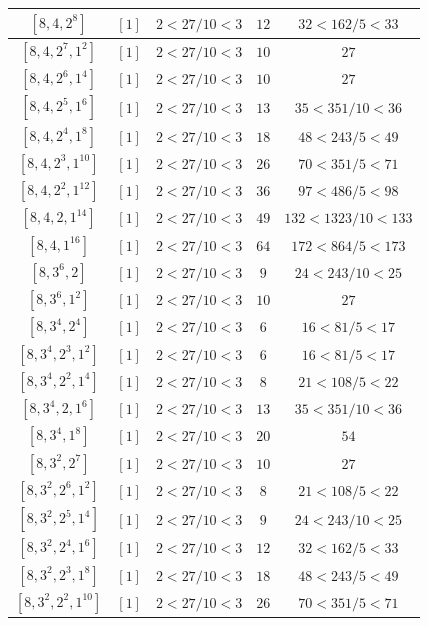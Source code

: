 \documentclass{article}%
\begin{document}
\begin{center}
\begin{longtable}{||c|c|c|c|c||}
$[8, 4, 2^{8}]$ & $[1]$ & $2 < 27/10 < 3$ & $12$ & $32 < 162/5 < 33$ \\ \hline 
$[8, 4, 2^{7}, 1^{2}]$ & $[1]$ & $2 < 27/10 < 3$ & $10$ & $27$ \\ \hline 
$[8, 4, 2^{6}, 1^{4}]$ & $[1]$ & $2 < 27/10 < 3$ & $10$ & $27$ \\ \hline 
$[8, 4, 2^{5}, 1^{6}]$ & $[1]$ & $2 < 27/10 < 3$ & $13$ & $35 < 351/10 < 36$ \\ \hline 
$[8, 4, 2^{4}, 1^{8}]$ & $[1]$ & $2 < 27/10 < 3$ & $18$ & $48 < 243/5 < 49$ \\ \hline 
$[8, 4, 2^{3}, 1^{10}]$ & $[1]$ & $2 < 27/10 < 3$ & $26$ & $70 < 351/5 < 71$ \\ \hline 
$[8, 4, 2^{2}, 1^{12}]$ & $[1]$ & $2 < 27/10 < 3$ & $36$ & $97 < 486/5 < 98$ \\ \hline 
$[8, 4, 2, 1^{14}]$ & $[1]$ & $2 < 27/10 < 3$ & $49$ & $132 < 1323/10 < 133$ \\ \hline 
$[8, 4, 1^{16}]$ & $[1]$ & $2 < 27/10 < 3$ & $64$ & $172 < 864/5 < 173$ \\ \hline 
$[8, 3^{6}, 2]$ & $[1]$ & $2 < 27/10 < 3$ & $9$ & $24 < 243/10 < 25$ \\ \hline 
$[8, 3^{6}, 1^{2}]$ & $[1]$ & $2 < 27/10 < 3$ & $10$ & $27$ \\ \hline 
$[8, 3^{4}, 2^{4}]$ & $[1]$ & $2 < 27/10 < 3$ & $6$ & $16 < 81/5 < 17$ \\ \hline 
$[8, 3^{4}, 2^{3}, 1^{2}]$ & $[1]$ & $2 < 27/10 < 3$ & $6$ & $16 < 81/5 < 17$ \\ \hline 
$[8, 3^{4}, 2^{2}, 1^{4}]$ & $[1]$ & $2 < 27/10 < 3$ & $8$ & $21 < 108/5 < 22$ \\ \hline 
$[8, 3^{4}, 2, 1^{6}]$ & $[1]$ & $2 < 27/10 < 3$ & $13$ & $35 < 351/10 < 36$ \\ \hline 
$[8, 3^{4}, 1^{8}]$ & $[1]$ & $2 < 27/10 < 3$ & $20$ & $54$ \\ \hline 
$[8, 3^{2}, 2^{7}]$ & $[1]$ & $2 < 27/10 < 3$ & $10$ & $27$ \\ \hline 
$[8, 3^{2}, 2^{6}, 1^{2}]$ & $[1]$ & $2 < 27/10 < 3$ & $8$ & $21 < 108/5 < 22$ \\ \hline 
$[8, 3^{2}, 2^{5}, 1^{4}]$ & $[1]$ & $2 < 27/10 < 3$ & $9$ & $24 < 243/10 < 25$ \\ \hline 
$[8, 3^{2}, 2^{4}, 1^{6}]$ & $[1]$ & $2 < 27/10 < 3$ & $12$ & $32 < 162/5 < 33$ \\ \hline 
$[8, 3^{2}, 2^{3}, 1^{8}]$ & $[1]$ & $2 < 27/10 < 3$ & $18$ & $48 < 243/5 < 49$ \\ \hline 
$[8, 3^{2}, 2^{2}, 1^{10}]$ & $[1]$ & $2 < 27/10 < 3$ & $26$ & $70 < 351/5 < 71$ \\ \hline 

\end{longtable}
\end{center}
\end{document}
